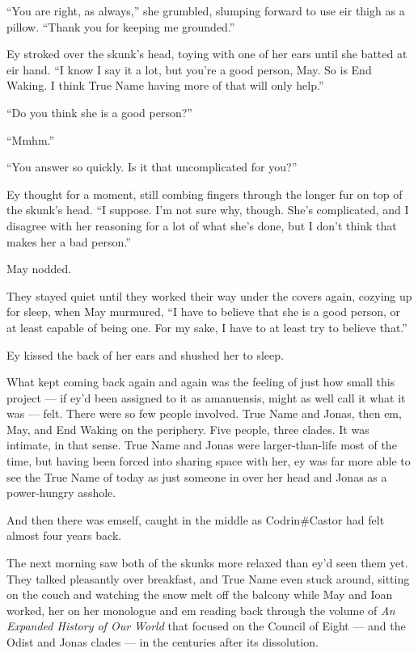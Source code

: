 ``You are right, as always,'' she grumbled, slumping forward to use eir thigh as a pillow. ``Thank you for keeping me grounded.''

Ey stroked over the skunk's head, toying with one of her ears until she batted at eir hand. ``I know I say it a lot, but you're a good person, May. So is End Waking. I think True Name having more of that will only help.''

``Do you think she is a good person?''

``Mmhm.''

``You answer so quickly. Is it that uncomplicated for you?''

Ey thought for a moment, still combing fingers through the longer fur on top of the skunk's head. ``I suppose. I'm not sure why, though. She's complicated, and I disagree with her reasoning for a lot of what she's done, but I don't think that makes her a bad person.''

May nodded.

They stayed quiet until they worked their way under the covers again, cozying up for sleep, when May murmured, ``I have to believe that she is a good person, or at least capable of being one. For my sake, I have to at least try to believe that.''

Ey kissed the back of her ears and shushed her to sleep.

What kept coming back again and again was the feeling of just how small this project — if ey'd been assigned to it as amanuensis, might as well call it what it was — felt. There were so few people involved. True Name and Jonas, then em, May, and End Waking on the periphery. Five people, three clades. It was intimate, in that sense. True Name and Jonas were larger-than-life most of the time, but having been forced into sharing space with her, ey was far more able to see the True Name of today as just someone in over her head and Jonas as a power-hungry asshole.

And then there was emself, caught in the middle as Codrin\#Castor had felt almost four years back.

The next morning saw both of the skunks more relaxed than ey'd seen them yet. They talked pleasantly over breakfast, and True Name even stuck around, sitting on the couch and watching the snow melt off the balcony while May and Ioan worked, her on her monologue and em reading back through the volume of \emph{An Expanded History of Our World} that focused on the Council of Eight — and the Odist and Jonas clades — in the centuries after its dissolution.

